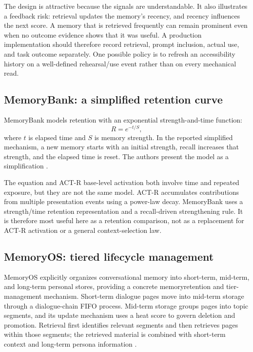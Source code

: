 The design is attractive because the signals are understandable. It also illustrates a feedback risk: retrieval updates the memory's recency, and recency influences the next score. A memory that is retrieved frequently can remain prominent even when no outcome evidence shows that it was useful. A production implementation should therefore record retrieval, prompt inclusion, actual use, and task outcome separately. One possible policy is to refresh an accessibility history on a well-defined rehearsal/use event rather than on every mechanical read.

\subsection{MemoryBank: a simplified retention curve}
\label{subsec:ch12-memorybank}

MemoryBank models retention with an exponential strength-and-time function:
\begin{equation}
  R=e^{-t/S},
  \label{eq:ch12-memorybank}
\end{equation}
where \(t\) is elapsed time and \(S\) is memory strength. In the reported simplified mechanism, a new memory starts with an initial strength, recall increases that strength, and the elapsed time is reset. The authors present the model as a simplification \autocite{zhong2024memorybank}.

The equation and ACT-R base-level activation both involve time and repeated exposure, but they are not the same model. ACT-R accumulates contributions from multiple presentation events using a power-law decay. MemoryBank uses a strength/time retention representation and a recall-driven strengthening rule. It is therefore most useful here as a retention comparison, not as a replacement for ACT-R activation or a general context-selection law.

\subsection{MemoryOS: tiered lifecycle management}
\label{subsec:ch12-memoryos}

MemoryOS explicitly organizes conversational memory into short-term, mid-term, and long-term personal stores, providing a concrete \gls{memoryretention} and tier-management mechanism. Short-term dialogue pages move into mid-term storage through a dialogue-chain FIFO process. Mid-term storage groups pages into topic segments, and its update mechanism uses a heat score to govern deletion and promotion. Retrieval first identifies relevant segments and then retrieves pages within those segments; the retrieved material is combined with short-term context and long-term persona information \autocite{kang2025memoryos}.

